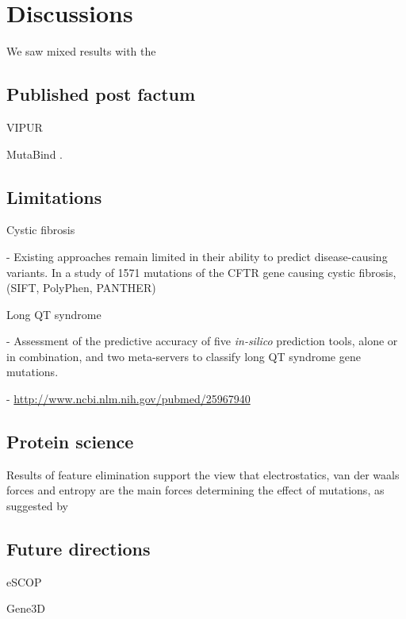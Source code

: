 
\chapter{Discussions} \label{chap:discussion}

We saw mixed results with the


\section{Published post factum}


VIPUR \cite{baugh_robust_2016}


MutaBind \cite{li_mutabind_2016}.


\section{Limitations}

Cystic fibrosis

  - Existing approaches remain limited in their ability to predict disease-causing variants. In a study of 1571 mutations of the CFTR gene causing cystic fibrosis, (SIFT, PolyPhen, PANTHER) \cite{dorfman_common_2010}

Long QT syndrome

  - Assessment of the predictive accuracy of five \textit{in-silico} prediction tools, alone or in combination, and two meta-servers to classify long QT syndrome gene mutations.

  - \url{http://www.ncbi.nlm.nih.gov/pubmed/25967940}


\section{Protein science}

Results of feature elimination support the view that electrostatics, van der waals forces and entropy are the main forces determining the effect of mutations, as suggested by


\section{Future directions}


eSCOP

Gene3D

